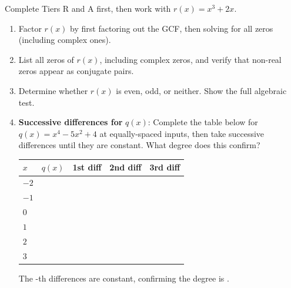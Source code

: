 \documentclass[10pt]{article}
\begin{document}
\begin{tcolorbox}[colback=white, colframe=black!40,
    title=\textbf{Tier E --- Extend},
    fonttitle=\bfseries, arc=2mm, left=3mm, right=3mm, top=2mm, bottom=2mm]

Complete Tiers R and A first, then work with $r(x)=x^3+2x$.

\begin{enumerate}[leftmargin=1.5em, itemsep=8pt]
  \item Factor $r(x)$ by first factoring out the GCF, then solving for all zeros
        (including complex ones).

  \item List all zeros of $r(x)$, including complex zeros, and verify that non-real
        zeros appear as conjugate pairs.
        \writeline

  \item Determine whether $r(x)$ is even, odd, or neither. Show the full algebraic test.

  \item \textbf{Successive differences for }$q(x)$: Complete the table below for
        $q(x)=x^4-5x^2+4$ at equally-spaced inputs, then take successive differences
        until they are constant. What degree does this confirm?

  \renewcommand{\arraystretch}{1.5}
  \begin{tabularx}{\linewidth}{|X|X|X|X|X|}
  \hline
  \rowcolor{sky}
  $x$ & $q(x)$ & 1st diff & 2nd diff & 3rd diff \\
  \hline
  $-2$ & & & & \\
  \hline
  $-1$ & & & & \\
  \hline
  $0$  & & & & \\
  \hline
  $1$  & & & & \\
  \hline
  $2$  & & & & \\
  \hline
  $3$  & & & & \\
  \hline
  \end{tabularx}

  The \blank{2cm}-th differences are constant, confirming the degree is \blank{2cm}.

\end{enumerate}
\end{tcolorbox}
\end{document}
